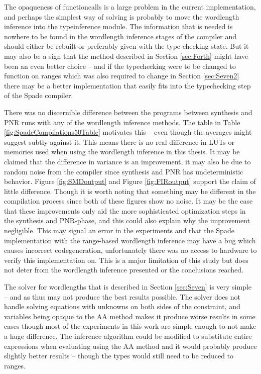 The opaqueness of functioncalls is a large problem in the current implementation, and perhaps the simplest way of solving is probably to move the wordlength inference into the typeinference module. The information that is needed is nowhere to be found in the wordlength inference stages of the compiler and should either be rebuilt or preferably given with the type checking state. But it may also be a sign that the method described in Section \ref{sec:Forth} might have been an even better choice -- and if the typechecking were to be changed to function on ranges which was also required to change in Section \ref{sec:Seven2} there may be a better implementation that easily fits into the typechecking step of the Spade compiler.

There was no discernible difference between the programs between synthesis and PNR runs with any of the wordlength inference methods. The table in Table \ref{fig:SpadeCompilations50Table} motivates this -- even though the averages might suggest subtly against it. This means there is no real difference in LUTs or memories used when using the wordlength inference in this thesis. It may be claimed that the difference in variance is an improvement, it may also be due to random noise from the compiler since synthesis and PNR has undeterministic behavior. Figure \ref{fig:SMDoutput} and Figure \ref{fig:FIRoutput} support the claim of little difference. Though it is worth noting that something may be different in the compilation process since both of these figures show no noise. It may be the case that these improvements only aid the more sophisticated optimization steps in the synthesis and PNR-phase, and this could also explain why the improvement negligible. This may signal an error in the experiments and that the Spade implementation with the range-based wordlength inference may have a bug which causes incorrect codegeneration, unfortunately there was no access to hardware to verify this implementation on. This is a major limitation of this study but does not deter from the wordlength inference presented or the conclusions reached.

The solver for wordlengths that is described in Section \ref{sec:Seven} is very simple -- and as thus may not produce the best results possible. The solver does not handle solving equations with unknowns on both sides of the constraint, and variables being opaque to the AA method makes it produce worse results in some cases though most of the experiments in this work are simple enough to not make a huge difference. The inference algorithm could be modified to substitute entire expressions when evaluating using the AA method and it would probably produce slightly better results -- though the types would still need to be reduced to ranges.

